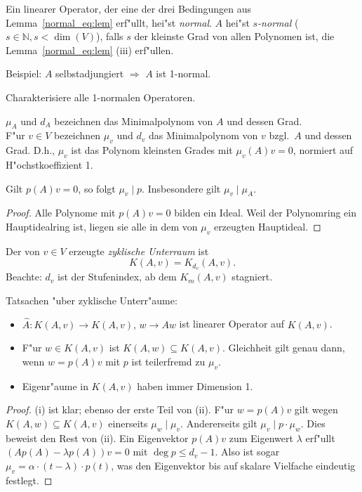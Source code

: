 \begin{defn} 
Ein linearer Operator, der eine der drei Bedingungen aus Lemma~\ref{normal_eq:lem}
erf"ullt, hei"st {\em normal}. $A$ hei"st {\em $s$-normal} ($s \in \mathbb{N}, s < \dim(V)$), falls 
$s$ der kleinste Grad von allen Polynomen ist, die 
Lemma~\ref{normal_eq:lem} (iii) erf"ullen.
\end{defn}
\medskip

Beispiel: $A$ selbstadjungiert $\Rightarrow$ $A$ ist 1-normal.
\medskip

\begin{aufg} Charakterisiere alle 1-normalen Operatoren.
\end{aufg}

\begin{defn}
$\mu_A$ und $d_A$ bezeichnen das Minimalpolynom von $A$ und dessen Grad. 
\\
F"ur $v \in V$ bezeichnen $\mu_v$ und $d_v$ das Minimalpolynom von $v$ bzgl.\ $A$
und dessen Grad. D.h., $\mu_v$ ist das Polynom kleinsten Grades mit 
$\mu_v(A)v = 0$, normiert auf H"ochstkoeffizient 1.
\end{defn}

\begin{lem} Gilt $p(A)v = 0$, so folgt $\mu_v \mid p$. Insbesondere
gilt $\mu_v \mid \mu_A$.
\end{lem}  
\begin{proof} Alle Polynome mit $p(A)v = 0$ bilden ein Ideal. Weil
der Polynomring ein Hauptidealring ist, liegen sie alle in dem 
von $\mu_v$ erzeugten Hauptideal.
\end{proof}

\begin{defn} Der von $v \in V$ erzeugte {\em zyklische Unterraum} ist
\[
   K(A,v) = K_{d_v}(A,v).
\]
Beachte: $d_v$ ist der Stufenindex, ab dem $K_m(A,v)$ stagniert.
\end{defn}

\begin{lem} \label{normal_tat1:lem}
Tatsachen "uber zyklische Unterr"aume:
\begin{itemize}
\item[(i)] $\hat{A}: K(A,v) \to K(A,v), \, w \to Aw$ ist linearer Operator auf $K(A,v)$.
\item[(ii)] F"ur $ w \in K(A,v)$ ist $K(A,w) \subseteq K(A,v)$. Gleichheit gilt genau dann,
          wenn $w = p(A)v$ mit $p$ ist teilerfremd zu $\mu_v$. 
\item[(iii)] Eigenr"aume in $K(A,v)$ haben immer Dimension 1.
\end{itemize}
\end{lem}
\begin{proof}
(i) ist klar; ebenso der erste Teil von (ii). F"ur $w = p(A)v$ gilt wegen $K(A,w) \subseteq 
K(A,v)$  einerseits $\mu_w \mid \mu_v$. Andererseits gilt
 $\mu_v \mid p \cdot \mu_w$. Dies beweist den Rest von (ii). Ein Eigenvektor $p(A)v$ zum Eigenwert $\lambda$
erf"ullt $(Ap(A)-\lambda p(A))v = 0$ mit $\deg p \leq d_v-1$. Also ist sogar $\mu_v = \alpha \cdot (t-\lambda) \cdot p(t)$,
was den Eigenvektor bis auf skalare Vielfache eindeutig festlegt.
\end{proof}


